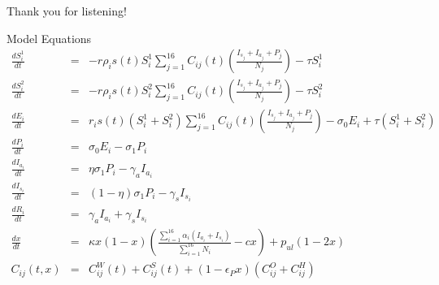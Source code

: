 \documentclass{beamer}
\begin{document}
\begin{frame}{}
    \begin{center}
        \huge
        Thank you for listening!
    \end{center}
\end{frame}

\begin{frame}[t,allowframebreaks]
    \printbibliography
\end{frame}



\begin{frame}{Model Equations}
    \tiny
        \begin{eqnarray}
            \frac{dS^1_i}{dt} &= & - r \rho_i s(t) S^1_i \sum_{j=1}^{16} C_{ij}(t) \left(\frac{I_{s_j} + I_{a_j} + P_j}{N_j}\right) - \tau S^1_i  \label{S1eqn} \\
            \frac{dS^2_i}{dt} &= & - r \rho_i s(t) S^2_i \sum_{j=1}^{16} C_{ij}(t) \left(\frac{I_{s_j} + I_{a_j}+ P_j}{N_j}\right)  - \tau S^2_i  \label{S2eqn} \\
            \frac{dE_i}{dt} &= &  r_i s(t) (S^1_i + S^2_i) \sum_{j=1}^{16} C_{ij}(t) \left(\frac{I_{s_j} + I_{a_j}+ P_j}{N_j}\right) - \sigma_0 E_i + \tau (S^1_i + S^2_i)\label{Eeqn} \\
            \frac{dP_i}{dt} &= & \sigma_0 E_i - \sigma_1 P_i \label{Peqn} \\
            \frac{dI_{a_i}}{dt} &= & \eta \sigma_1 P_i - \gamma_a I_{a_i}\label{Ieqn} \\
            \frac{dI_{s_i}}{dt} &= & (1 - \eta) \sigma_1 P_i - \gamma_s I_{s_i} \label{Ieqn} \\
            \frac{dR_i}{dt} &= & \gamma_a I_{a_i} + \gamma_s I_{s_i}  \label{Reqn} \\
            \frac{dx}{dt} &= &\kappa x (1-x) \left(\frac{\sum_{i=1}^{16}\alpha_i(I_{a_i} + I_{s_i})}{\sum_{i=1}^{16} N_i} - c x\right) + p_{ul}(1-2 x)  \label{xeqn_new}\\
    C_{ij}(t,x) &= & C^W_{ij}(t) + C^S_{ij}(t) + (1 - \epsilon_P x )\left({C}^O_{ij} + {C}^H_{ij}\right)
        \end{eqnarray}
    \end{frame}
\end{document}
